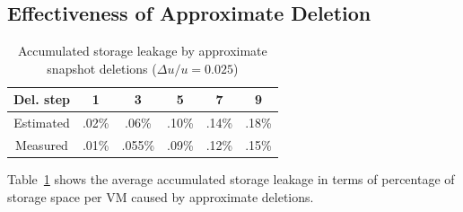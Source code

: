  \subsection{Effectiveness of Approximate Deletion}

\begin{table}
\centering
\begin{small}
    \begin{tabular}{|c|c|c|c|c|c|}
    \hline
Del. step   &     1 &  3  & 5 & 7  & 9 \\ 
\hline   
     Estimated& .02\% & .06\% & .10\%& .14\% & .18\%\\ 
\hline   
     Measured & .01\% & .055\% & .09\% & .12\% & .15\% \\
\hline   
    \end{tabular}
\end{small}
     \caption{Accumulated storage leakage by approximate snapshot deletions ($\Delta u/u=0.025$)}
     \label{tab:leakage}
\end{table}

Table~\ref{tab:leakage} shows the average accumulated storage leakage in terms of percentage of
storage space per VM caused  by approximate deletions.

